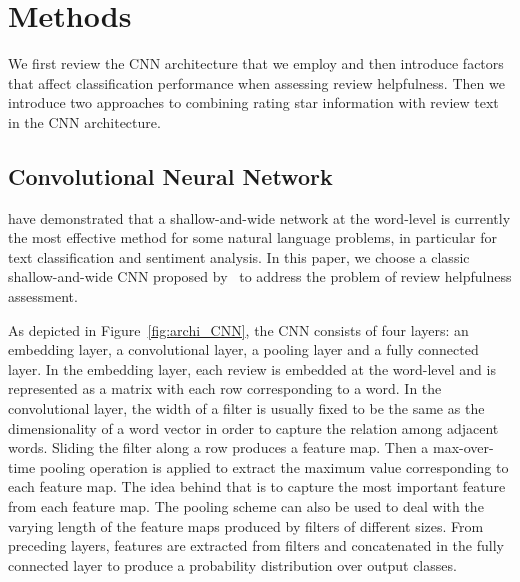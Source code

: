 \documentclass[conference,compsoc]{IEEEtran}
\begin{document}
\section{Methods}\label{sec:model}%

We first review the CNN architecture that we employ and then introduce factors that affect classification performance when assessing review helpfulness. Then we introduce two approaches to combining rating star information with review text in the CNN architecture.

\subsection{Convolutional Neural Network}\cite{Hoa_2017} have demonstrated that a shallow-and-wide network at the word-level is currently the most effective method for some natural language problems, in particular for text classification and sentiment analysis. In this paper, we choose a classic shallow-and-wide CNN proposed by~\cite{Kim14f} to address the problem of review helpfulness assessment.

As depicted in Figure~\ref{fig:archi_CNN}, the CNN consists of four layers: an embedding layer, a convolutional layer, a pooling layer and a fully connected layer. In the embedding layer, each review is embedded at the word-level and is represented as a matrix with each row corresponding to a word. In the convolutional layer, the width of a filter is usually fixed to be the same as the dimensionality of a word vector in order to capture the relation among adjacent words.
Sliding the filter along a row produces a feature map. Then a max-over-time pooling operation is applied to extract the maximum value corresponding to each feature map. The idea behind that is to capture the most important feature from each feature map. The pooling scheme can also be used to deal with the varying length of the feature maps produced by filters of different sizes. From preceding layers, features are extracted from filters and concatenated in the fully connected layer to produce a probability distribution over output classes.
\end{document}
